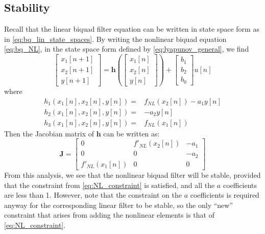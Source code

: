 \documentclass[twoside,a4paper]{article}
\begin{document}
\subsection{Stability}
%
Recall that the linear biquad filter equation can be written
in state space form as in \cref{eq:bq_lin_state_spaces}. By
writing the nonlinear biquad equation \cref{eq:bq_NL}, in
the state space form defined by \cref{eq:lyapunov_general},
we find
%
\begin{equation}
    \begin{bmatrix} x_1[n+1] \\ x_2[n+1] \\ y[n+1] \end{bmatrix} =
    \mathbf{h} \left( \begin{bmatrix} x_1[n] \\ x_2[n] \\ y[n] \end{bmatrix}
    \right) + \begin{bmatrix} b_1\\ b_2\\ b_0 \end{bmatrix} u[n]
    \label{eq:nlbq_states}
\end{equation}
%
where
%
\begin{equation}
    \begin{split}
        h_1(x_1[n], x_2[n], y[n]) =& f_{NL}(x_2[n]) - a_1y[n] \\
        h_2(x_1[n], x_2[n], y[n]) =& -a_2y[n] \\
        h_3(x_1[n], x_2[n], y[n]) =& f_{NL}(x_1[n])
    \end{split}
    \label{eq:nlbq_state_eqns}
\end{equation}
%
Then the Jacobian matrix of $\mathbf{h}$ can be written as:
%
\begin{equation}
    \mathbf{J} = \begin{bmatrix}
        0& f'_{NL}(x_2[n])& -a_1 \\
        0& 0& -a_2 \\
        f'_{NL}(x_1[n])& 0& 0
    \end{bmatrix}
    \label{eq:nlbq_Jacobian}
\end{equation}
%
From this analysis, we see that the nonlinear biquad filter will be
stable, provided that the constraint from \cref{eq:NL_constraint}
is satisfied, and all the $a$ coefficients are less than 1. However,
note that the constraint on the $a$ coefficients is required
anyway for the corresponding linear filter to be stable, so the
only ``new'' constraint that arises from adding the nonlinear
elements is that of \cref{eq:NL_constraint}.
\end{document}

